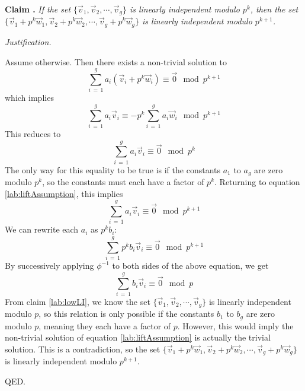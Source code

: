 \documentclass[12pt, a4paper, reqno]{amsart}
\newcounter{claimcounter}[section]
\newenvironment{claim}[1]
{
	\vspace{1em}
	\refstepcounter{claimcounter} %
	\textbf{Claim \theclaimcounter.} \emph{#1}
	
	\emph{Justification.}
}
{
	QED. \\
}
\begin{document}
	\begin{claim}{If the set $\{\vec{v}_{1}, \vec{v}_{2}, \cdots, \vec{v}_{g}\}$ is linearly independent modulo $p^{k}$, then the set
	$\{\vec{v}_{1} + p^{k}\vec{w}_{1}, \vec{v}_{2} + p^{k}\vec{w}_{2}, \cdots, \vec{v}_{g} + p^{k}\vec{w}_{g}\}$ is linearly independent modulo $p^{k+1}$.}
		Assume otherwise. Then there exists a non-trivial solution to
		\begin{equation}
			\label{lab:liftAssumption}
			\sum_{i\,=\,1}^{g} a_{i}(\vec{v}_{i} + p^{k}\vec{w}_{i}) \equiv \vec{0} \mod{p^{k+1}}
		\end{equation}
		which implies
		\[
			\sum_{i\,=\,1}^{g} a_{i}\vec{v}_{i} \equiv -p^{k}\sum_{i\,=\,1}^{g} a_{i}\vec{w}_{i} \mod{p^{k+1}}
		\]
		This reduces to
		\[
			\sum_{i\,=\,1}^{g} a_{i}\vec{v}_{i} \equiv \vec{0} \mod{p^{k}}
		\]
		The only way for this equality to be true is if the constants $a_{1}$ to $a_{g}$ are zero modulo $p^{k}$, so the constants must each have a factor of $p^{k}$. 
		Returning to equation \ref{lab:liftAssumption}, this implies
		\[
			\sum_{i\,=\,1}^{g} a_{i}\vec{v}_{i} \equiv \vec{0} \mod{p^{k+1}}
		\]
		We can rewrite each $a_{i}$ as $p^{k}b_{i}$:
		\[
			\sum_{i\,=\,1}^{g} p^{k}b_{i}\vec{v}_{i} \equiv \vec{0} \mod{p^{k+1}}
		\]
		By successively applying $\phi^{-1}$ to both sides of the above equation, we get
		\[
			\sum_{i\,=\,1}^{g} b_{i}\vec{v}_{i} \equiv \vec{0} \mod{p}
		\]
		From claim \ref{lab:lowLI}, we know the set $\{\vec{v}_{1}, \vec{v}_{2}, \cdots, \vec{v}_{g}\}$ is linearly independent modulo $p$, so
		this relation is only possible if the constants $b_{1}$ to $b_{g}$ are zero modulo $p$, meaning they each have a factor of $p$. However, this would imply the
		non-trivial solution of equation \ref{lab:liftAssumption} is actually the trivial solution. This is a contradiction, so the set
		$\{\vec{v}_{1} + p^{k}\vec{w}_{1}, \vec{v}_{2} + p^{k}\vec{w}_{2}, \cdots, \vec{v}_{g} + p^{k}\vec{w}_{g}\}$ is linearly independent modulo $p^{k+1}$.
	\end{claim}
\end{document}
